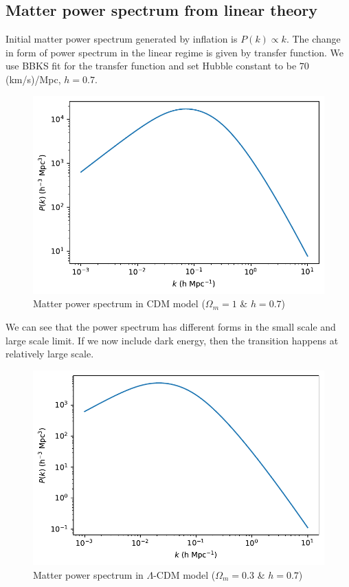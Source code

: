 \documentclass[12pt]{article}
\begin{document}
\pagebreak

\subsection{Matter power spectrum from linear theory}
\label{sec:power-spectrum-linear}
Initial matter power spectrum generated by inflation is $P(k) \propto k$. The change in form of power spectrum in the linear regime is given by transfer function. We use BBKS fit for the transfer function and set Hubble constant to be $ 70$ (km/s)/Mpc, $h=0.7$.

\begin{figure}[H]
	\centering
	\includegraphics[width=0.7\linewidth]{../jupyter-nb/standard-cdm-matter-Pk}
	\caption{Matter power spectrum in CDM model ($\Omega_m=1$ \& $h = 0.7$)}
	\label{fig:standard-cdm-matter-pk}
\end{figure}
We can see that the power spectrum has different forms in the small scale and large scale limit. If we now include dark energy, then the transition happens at relatively large scale.
%
\begin{figure}[H]
	\centering
	\includegraphics[width=0.7\linewidth]{../jupyter-nb/lambda-cdm-matter-Pk}
	\caption{Matter power spectrum in $\Lambda$-CDM model ($\Omega_m=0.3$ \& $h = 0.7$)}
	\label{fig:lambda-cdm-matter-pk}
\end{figure}
\end{document}
